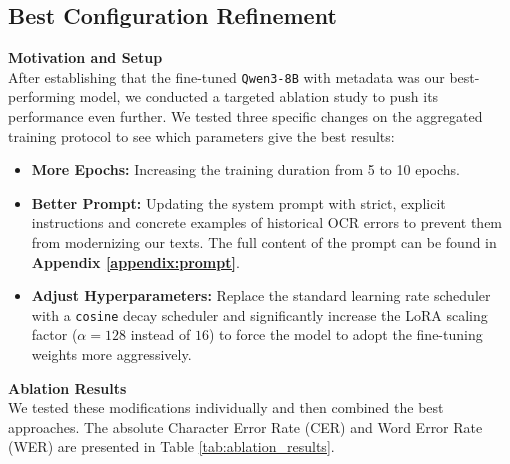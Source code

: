 \documentclass[11pt]{extarticle}
\begin{document}
\subsection{Best Configuration Refinement}

\noindent\textbf{Motivation and Setup}\\
After establishing that the fine-tuned \texttt{Qwen3-8B} with metadata was our best-performing model, we conducted a targeted ablation study to push its performance even further. We tested three specific changes on the aggregated training protocol to see which parameters give the best results:

\begin{itemize}
    \item \textbf{More Epochs:} Increasing the training duration from 5 to 10 epochs.
    \item \textbf{Better Prompt:} Updating the system prompt with strict, explicit instructions and concrete examples of historical OCR errors to prevent them from modernizing our texts. The full content of the prompt can be found in \textbf{Appendix \ref{appendix:prompt}}.
    \item \textbf{Adjust Hyperparameters:} Replace the standard learning rate scheduler with a \texttt{cosine} decay scheduler and significantly increase the LoRA scaling factor ($\alpha=128$ instead of $16$) to force the model to adopt the fine-tuning weights more aggressively.
\end{itemize}

\noindent\textbf{Ablation Results}\\
We tested these modifications individually and then combined the best approaches. The absolute Character Error Rate (CER) and Word Error Rate (WER) are presented in Table \ref{tab:ablation_results}.
\end{document}
